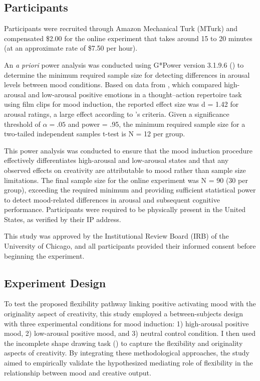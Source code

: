 \documentclass[../MA_Thesis.tex]{subfiles}
\begin{document}
\subsection*{Participants}
Participants were recruited through Amazon Mechanical Turk (MTurk) and compensated \$2.00 for the online experiment that takes around 15 to 20 minutes (at an approximate rate of \$7.50 per hour). 

An \textit{a priori} power analysis was conducted using G*Power version 3.1.9.6 (\cite{faul_gpower_2007}) to determine the minimum required sample size for detecting differences in arousal levels between mood conditions. Based on data from \textcite{sugawara_effect_2021}, which compared high-arousal and low-arousal positive emotions in a thought–action repertoire task using film clips for mood induction, the reported effect size was d = 1.42 for arousal ratings, a large effect according to \textcite{cohen_power_1992}'s criteria. Given a significance threshold of $\alpha = .05$ and power = .95, the minimum required sample size for a two-tailed independent samples t-test is N = 12 per group. 

This power analysis was conducted to ensure that the mood induction procedure effectively differentiates high-arousal and low-arousal states and that any observed effects on creativity are attributable to mood rather than sample size limitations. The final sample size for the online experiment was N = 90 (30 per group), exceeding the required minimum and providing sufficient statistical power to detect mood-related differences in arousal and subsequent cognitive performance. Participants were required to be physically present in the United States, as verified by their IP address.

This study was approved by the Institutional Review Board (IRB) of the University of Chicago, and all participants provided their informed consent before beginning the experiment.

\subsection*{Experiment Design}
To test the proposed flexibility pathway linking positive activating mood with the originality aspect of creativity, this study employed a between-subjects design with three experimental conditions for mood induction: 1) high-arousal positive mood, 2) low-arousal positive mood, and 3) neutral control condition. I then used the incomplete shape drawing task (\cite{barbot_dynamics_2018}) to capture the flexibility and originality aspects of creativity. By integrating these methodological approaches, the study aimed to empirically validate the hypothesized mediating role of flexibility in the relationship between mood and creative output.
\end{document}
